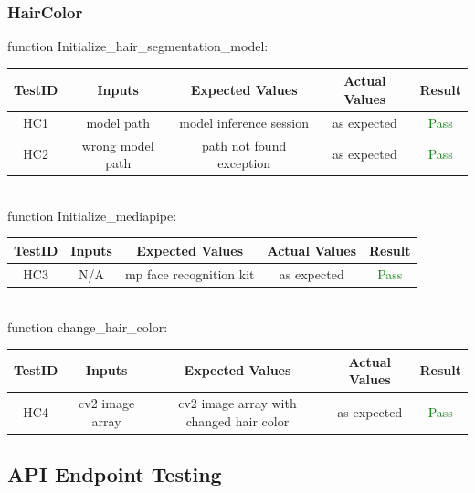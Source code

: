 \documentclass[12pt, titlepage]{article}
\begin{document}
\subsubsection{HairColor}
function Initialize\_hair\_segmentation\_model:\\
\newline
\begin{tabular}{ |c|c|c|c|c| } 
 \hline
 TestID & Inputs & Expected Values & Actual Values & Result \\ 
 \hline
HC1 & model path & model inference session & as expected & \textcolor{green}{Pass} \\
HC2 & wrong model path & path not found exception & as expected & \textcolor{green}{Pass} \\
 \hline
\end{tabular}
\\
\newline
function Initialize\_mediapipe:\\
\newline
\begin{tabular}{ |c|c|c|c|c| } 
 \hline
 TestID & Inputs & Expected Values & Actual Values & Result \\ 
 \hline
HC3 & N/A & mp face recognition kit & as expected & \textcolor{green}{Pass} \\
 \hline
\end{tabular}
\\
\newline
function change\_hair\_color:\\
\newline
\begin{tabular}{ |c|c|c|c|c| } 
 \hline
 TestID & Inputs & Expected Values & Actual Values & Result \\ 
 \hline
HC4 & cv2 image array & cv2 image array with changed hair color & as expected & \textcolor{green}{Pass} \\
 \hline
\end{tabular}

\subsection{API Endpoint Testing}
\end{document}
